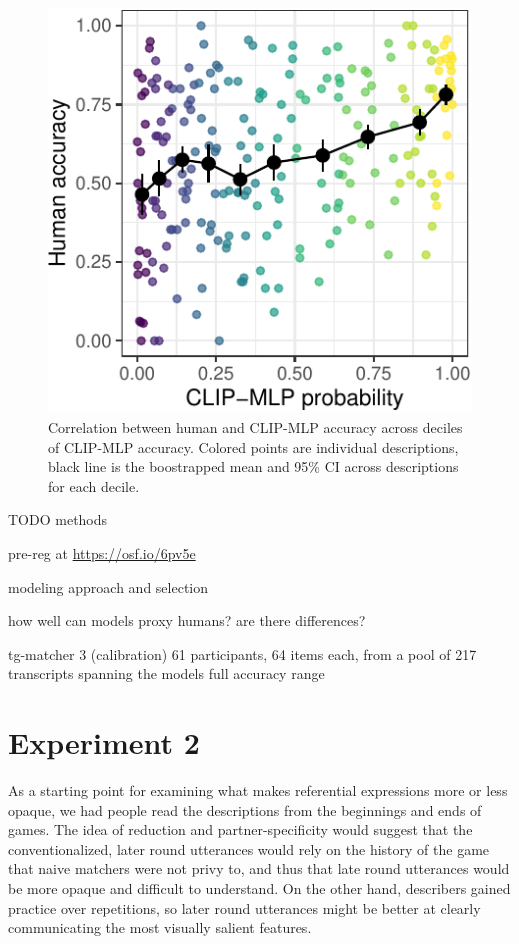 \documentclass[10pt, letterpaper]{article}
\begin{document}
\begin{CodeChunk}
\begin{figure}[t]

{\centering \includegraphics[width=0.7\linewidth]{figs/fig-calibration-1} 

}

\caption[Correlation between human and CLIP-MLP accuracy across deciles of CLIP-MLP accuracy]{Correlation between human and CLIP-MLP accuracy across deciles of CLIP-MLP accuracy. Colored points are individual descriptions, black line is the boostrapped mean and 95\% CI across descriptions for each decile. \label{calibration}}\label{fig:fig-calibration}
\end{figure}
\end{CodeChunk}

TODO methods

pre-reg at \url{https://osf.io/6pv5e}

modeling approach and selection

how well can models proxy humans? are there differences?

tg-matcher 3 (calibration) 61 participants, 64 items each, from a pool
of 217 transcripts spanning the models full accuracy range

\section{Experiment 2}\label{experiment-2}

As a starting point for examining what makes referential expressions
more or less opaque, we had people read the descriptions from the
beginnings and ends of games. The idea of reduction and
partner-specificity would suggest that the conventionalized, later round
utterances would rely on the history of the game that naive matchers
were not privy to, and thus that late round utterances would be more
opaque and difficult to understand. On the other hand, describers gained
practice over repetitions, so later round utterances might be better at
clearly communicating the most visually salient features.
\end{document}
